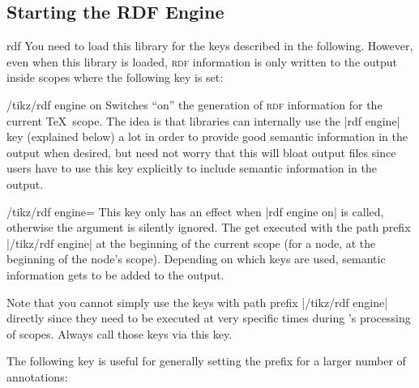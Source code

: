 \subsection{Starting the RDF Engine}

\begin{tikzlibrary}{rdf}
    You need to load this library for the keys described in the following.
    However, even when this library is loaded, \textsc{rdf} information is only
    written to the output inside scopes where the following key is set:
    \begin{key}{/tikz/rdf engine on}
        Switches ``on'' the generation of \textsc{rdf} information for the
        current \TeX\ scope. The idea is that libraries can internally use the
        |rdf engine| key (explained below) a lot in order to provide good
        semantic information in the output when desired, but need not worry
        that this will bloat output files since users have to use this key
        explicitly to include semantic information in the output.
    \end{key}
\end{tikzlibrary}

\begin{key}{/tikz/rdf engine=}
    This key only has an effect when |rdf engine on| is called, otherwise the
    argument is silently ignored. The  get executed with the
    path prefix |/tikz/rdf engine| at the beginning of the current scope (for a
    node, at the beginning of the node's scope). Depending on which keys are
    used, semantic information gets to be added to the output.

    Note that you cannot simply use the keys with path prefix |/tikz/rdf engine|
    directly since they need to be executed at very specific times during
    \tikzname's processing of scopes. Always call those keys via this key.
\end{key}

The following key is useful for generally setting the prefix for a larger
number of annotations:

